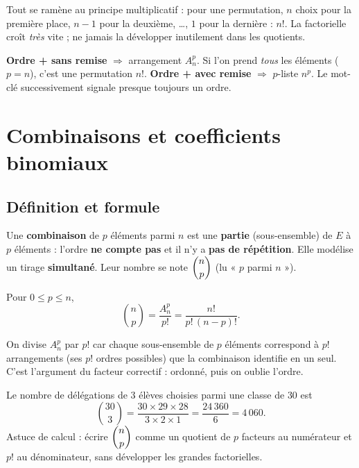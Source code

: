 \begin{remarque}
Tout se ramène au principe multiplicatif : pour une permutation, $n$ choix pour la première
place, $n-1$ pour la deuxième, \dots, $1$ pour la dernière : $n!$. La factorielle croît
\emph{très} vite ; ne jamais la développer inutilement dans les quotients.
\end{remarque}

\begin{aretenir}
\textbf{Ordre + sans remise} $\Rightarrow$ arrangement $A_n^{p}$. Si l'on prend \emph{tous}
les éléments ($p=n$), c'est une permutation $n!$. \textbf{Ordre + avec remise} $\Rightarrow$
$p$-liste $n^{p}$. Le mot-clé \og successivement \fg{} signale presque toujours un ordre.
\end{aretenir}

\section{Combinaisons et coefficients binomiaux}

\subsection{Définition et formule}

\begin{definition}[Combinaison]
Une \textbf{combinaison} de $p$ éléments parmi $n$ est une \textbf{partie} (sous-ensemble) de $E$ à $p$ éléments : l'ordre \textbf{ne compte pas} et il n'y a \textbf{pas de répétition}. Elle modélise un tirage \textbf{simultané}. Leur nombre se note $\dbinom np$ (lu « $p$ parmi $n$ »).
\end{definition}

\begin{theoreme}
Pour $0\le p\le n$,
\[
\binom np=\frac{A_n^{p}}{p!}=\frac{n!}{p!\,(n-p)!}.
\]
\end{theoreme}

\begin{remarque}
On divise $A_n^{p}$ par $p!$ car chaque sous-ensemble de $p$ éléments correspond à $p!$ arrangements (ses $p!$ ordres possibles) que la combinaison identifie en un seul. C'est l'argument du \og facteur correctif \fg{} : ordonné, puis on \og oublie \fg{} l'ordre.
\end{remarque}

\begin{exemple}
Le nombre de délégations de $3$ élèves choisies parmi une classe de $30$ est
\[
\binom{30}{3}=\frac{30\times 29\times 28}{3\times 2\times 1}=\frac{24\,360}{6}=4\,060.
\]
Astuce de calcul : écrire $\dbinom np$ comme un quotient de $p$ facteurs au numérateur
et $p!$ au dénominateur, sans développer les grandes factorielles.
\end{exemple}

